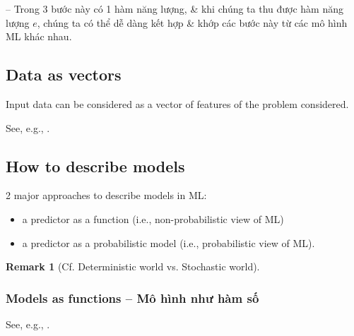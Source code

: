 \documentclass{article}
\newtheorem{remark}{Remark}
\begin{document}
-- Trong 3 bước này có 1 hàm năng lượng, \& khi chúng ta thu được hàm năng lượng $e$, chúng ta có thể dễ dàng kết hợp \& khớp các bước này từ các mô hình ML khác nhau.


\subsection{Data as vectors}
Input data can be considered as a vector of features of the problem considered.

See, e.g., \cite[Chap. 8, Sect. 8.1.1: Data as Vectors]{Deisenroth_Faisal_Ong2024}.


\subsection{How to describe models}
2 major approaches to describe models in ML:
\begin{itemize}
	\item a predictor as a function (i.e., non-probabilistic view of ML)
	\item a predictor as a probabilistic model (i.e., probabilistic view of ML).
\end{itemize}

\begin{remark}[Cf. Deterministic world vs. Stochastic world]
	
\end{remark}


\subsubsection{Models as functions -- Mô hình như hàm số}
See, e.g., \cite[Chap. 8, Sect. 8.1.2: Models as Functions]{Deisenroth_Faisal_Ong2024}.
\end{document}
